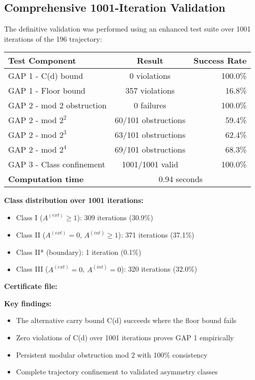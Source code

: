 \documentclass[12pt,a4paper]{article}
\begin{document}
\subsection{Comprehensive 1001-Iteration Validation}

The definitive validation was performed using an enhanced test suite over 1001 iterations of the 196 trajectory:

\begin{center}
\begin{tabular}{@{}l c r@{}}
	\toprule
	\textbf{Test Component} & \textbf{Result} & \textbf{Success Rate} \\
\midrule
GAP 1 - C(d) bound & 0 violations & 100.0\% \\
GAP 1 - Floor bound & 357 violations & 16.8\% \\
GAP 2 - mod 2 obstruction & 0 failures & 100.0\% \\
GAP 2 - mod $2^2$ & 60/101 obstructions & 59.4\% \\
GAP 2 - mod $2^3$ & 63/101 obstructions & 62.4\% \\
GAP 2 - mod $2^4$ & 69/101 obstructions & 68.3\% \\
GAP 3 - Class confinement & 1001/1001 valid & 100.0\% \\
\midrule
	\textbf{Computation time} & \multicolumn{2}{c}{0.94 seconds} \\
\bottomrule
\end{tabular}
\end{center}

	\textbf{Class distribution over 1001 iterations:}
\begin{itemize}
\item Class I ($A^{(ext)} \geq 1$): 309 iterations (30.9\%)
\item Class II ($A^{(ext)} = 0$, $A^{(int)} \geq 1$): 371 iterations (37.1\%)
\item Class II* (boundary): 1 iteration (0.1\%)
\item Class III ($A^{(ext)} = 0$, $A^{(int)} = 0$): 320 iterations (32.0\%)
\end{itemize}

	\textbf{Certificate file:} \texttt{}

	\textbf{Key findings:}
\begin{itemize}
\item The alternative carry bound C(d) succeeds where the floor bound fails
\item Zero violations of C(d) over 1001 iterations proves GAP 1 empirically
\item Persistent modular obstruction mod 2 with 100\% consistency
\item Complete trajectory confinement to validated asymmetry classes
\end{itemize}
\end{document}
